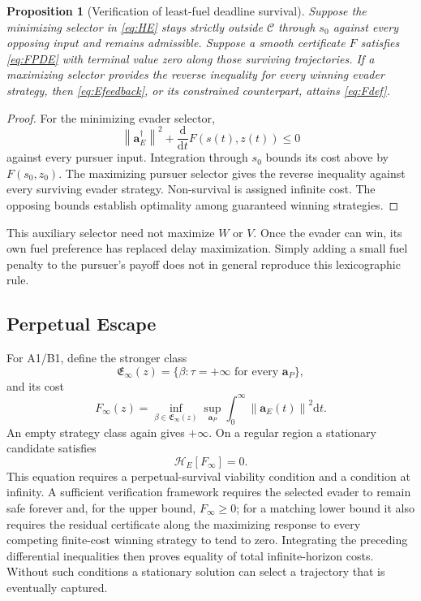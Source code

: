 \documentclass[journal,a4paper]{IEEEtran}
\newtheorem{proposition}{Proposition}
\newcommand{\C}{\mathcal C}
\newcommand{\HH}{\mathcal H}
\newcommand{\norm}[1]{\left\|#1\right\|}
\newcommand{\dd}{\mathrm d}
\begin{document}
\begin{proposition}[Verification of least-fuel deadline survival]
Suppose the minimizing selector in \eqref{eq:HE} stays strictly outside $\C$ through $s_0$ against every opposing input and remains admissible. Suppose a smooth certificate $F$ satisfies \eqref{eq:FPDE} with terminal value zero along those surviving trajectories. If a maximizing selector provides the reverse inequality for every winning evader strategy, then \eqref{eq:Efeedback}, or its constrained counterpart, attains \eqref{eq:Fdef}.
\end{proposition}
\begin{proof}
For the minimizing evader selector,
\begin{equation}
 \norm{\mathbf a_E^{\dagger}}^2+\frac{\dd}{\dd t}F(s(t),z(t))\le0
\end{equation}
against every pursuer input. Integration through $s_0$ bounds its cost above by $F(s_0,z_0)$. The maximizing pursuer selector gives the reverse inequality against every surviving evader strategy. Non-survival is assigned infinite cost. The opposing bounds establish optimality among guaranteed winning strategies.
\end{proof}

This auxiliary selector need not maximize $W$ or $V$. Once the evader can win, its own fuel preference has replaced delay maximization. Simply adding a small fuel penalty to the pursuer's payoff does not in general reproduce this lexicographic rule.

\subsection{Perpetual Escape}
For A1/B1, define the stronger class
\begin{equation}
 \mathfrak E_\infty(z)=\{\beta:\tau=+\infty
                             \text{ for every }\mathbf a_P\},
\end{equation}
and its cost
\begin{equation}
 F_\infty(z)=\inf_{\beta\in\mathfrak E_\infty(z)}
        \sup_{\mathbf a_P}\int_0^\infty\norm{\mathbf a_E(t)}^2\dd t.
 \label{eq:Finfty}
\end{equation}
An empty strategy class again gives $+\infty$. On a regular region a stationary candidate satisfies
\begin{equation}
 \HH_E[F_\infty]=0.
 \label{eq:Fstationary}
\end{equation}
This equation requires a perpetual-survival viability condition and a condition at infinity. A sufficient verification framework requires the selected evader to remain safe forever and, for the upper bound, $F_\infty\ge0$; for a matching lower bound it also requires the residual certificate along the maximizing response to every competing finite-cost winning strategy to tend to zero. Integrating the preceding differential inequalities then proves equality of total infinite-horizon costs. Without such conditions a stationary solution can select a trajectory that is eventually captured.
\end{document}
